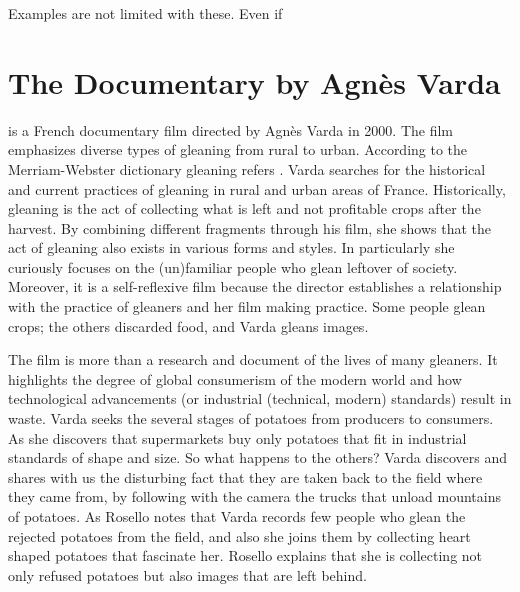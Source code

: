 Examples are not limited with these. Even if 




%
%
\section{The Documentary  by Agnès Varda}
 is a French documentary film directed by Agnès Varda in 2000. The film emphasizes diverse types of gleaning from rural to urban. According to the Merriam-Webster dictionary gleaning refers . Varda searches for the historical and current practices of gleaning in rural and urban areas of France. Historically, gleaning is the act of collecting what is left and not profitable crops after the harvest. By combining different fragments through his film, she shows that the act of gleaning also exists in various forms and styles. In particularly she curiously focuses on the (un)familiar people who glean leftover of society. Moreover, it is a self-reflexive film because the director establishes a relationship with the practice of gleaners and her film making practice. Some people glean crops; the others discarded food, and Varda gleans images.

The film is more than a research and document of the lives of many gleaners. It highlights the degree of global consumerism of the modern world and how technological advancements (or industrial (technical, modern) standards) result in waste. Varda seeks the several stages of potatoes from producers to consumers. As she discovers that supermarkets buy only potatoes that fit in industrial standards of shape and size. So what happens to the others? Varda discovers and shares with us the disturbing fact that they are taken back to the field where they came from, by following with the camera the trucks that unload mountains of potatoes. As Rosello notes that  Varda records few people who glean the rejected potatoes from the field, and also she joins them by collecting heart shaped potatoes that fascinate her. Rosello explains that she is collecting not only refused potatoes but also images that are left behind.

